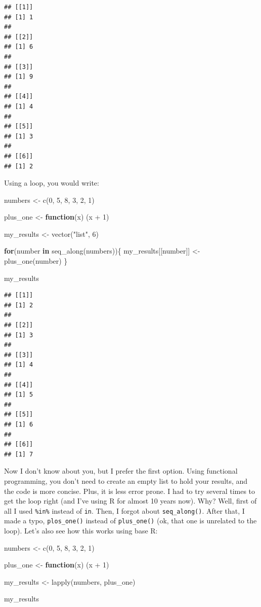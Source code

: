 \documentclass[
]{article}
\newenvironment{Shaded}{\begin{snugshade}}{\end{snugshade}}
\newcommand{\ControlFlowTok}[1]{\textcolor[rgb]{0.13,0.29,0.53}{\textbf{#1}}}
\newcommand{\DecValTok}[1]{\textcolor[rgb]{0.00,0.00,0.81}{#1}}
\newcommand{\FunctionTok}[1]{\textcolor[rgb]{0.00,0.00,0.00}{#1}}
\newcommand{\NormalTok}[1]{#1}
\newcommand{\OtherTok}[1]{\textcolor[rgb]{0.56,0.35,0.01}{#1}}
\newcommand{\SpecialCharTok}[1]{\textcolor[rgb]{0.00,0.00,0.00}{#1}}
\newcommand{\StringTok}[1]{\textcolor[rgb]{0.31,0.60,0.02}{#1}}
\begin{document}
\begin{verbatim}
## [[1]]
## [1] 1
## 
## [[2]]
## [1] 6
## 
## [[3]]
## [1] 9
## 
## [[4]]
## [1] 4
## 
## [[5]]
## [1] 3
## 
## [[6]]
## [1] 2
\end{verbatim}

Using a loop, you would write:

\begin{Shaded}
\begin{Highlighting}[]
\NormalTok{numbers }\OtherTok{\textless{}{-}} \FunctionTok{c}\NormalTok{(}\DecValTok{0}\NormalTok{, }\DecValTok{5}\NormalTok{, }\DecValTok{8}\NormalTok{, }\DecValTok{3}\NormalTok{, }\DecValTok{2}\NormalTok{, }\DecValTok{1}\NormalTok{)}

\NormalTok{plus\_one }\OtherTok{\textless{}{-}} \ControlFlowTok{function}\NormalTok{(x) (x }\SpecialCharTok{+} \DecValTok{1}\NormalTok{)}

\NormalTok{my\_results }\OtherTok{\textless{}{-}} \FunctionTok{vector}\NormalTok{(}\StringTok{"list"}\NormalTok{, }\DecValTok{6}\NormalTok{)}

\ControlFlowTok{for}\NormalTok{(number }\ControlFlowTok{in} \FunctionTok{seq\_along}\NormalTok{(numbers))\{}
\NormalTok{  my\_results[[number]] }\OtherTok{\textless{}{-}} \FunctionTok{plus\_one}\NormalTok{(number)}
\NormalTok{\}}

\NormalTok{my\_results}
\end{Highlighting}
\end{Shaded}

\begin{verbatim}
## [[1]]
## [1] 2
## 
## [[2]]
## [1] 3
## 
## [[3]]
## [1] 4
## 
## [[4]]
## [1] 5
## 
## [[5]]
## [1] 6
## 
## [[6]]
## [1] 7
\end{verbatim}

Now I don't know about you, but I prefer the first option. Using functional programming, you don't
need to create an empty list to hold your results, and the code is more concise. Plus,
it is less error prone. I had to try several times to get the loop right
(and I've using R for almost 10 years now). Why? Well, first of all I used \texttt{\%in\%} instead of \texttt{in}.
Then, I forgot about \texttt{seq\_along()}. After that, I made a typo, \texttt{plos\_one()} instead of \texttt{plus\_one()}
(ok, that one is unrelated to the loop). Let's also see how this works using base R:

\begin{Shaded}
\begin{Highlighting}[]
\NormalTok{numbers }\OtherTok{\textless{}{-}} \FunctionTok{c}\NormalTok{(}\DecValTok{0}\NormalTok{, }\DecValTok{5}\NormalTok{, }\DecValTok{8}\NormalTok{, }\DecValTok{3}\NormalTok{, }\DecValTok{2}\NormalTok{, }\DecValTok{1}\NormalTok{)}

\NormalTok{plus\_one }\OtherTok{\textless{}{-}} \ControlFlowTok{function}\NormalTok{(x) (x }\SpecialCharTok{+} \DecValTok{1}\NormalTok{)}

\NormalTok{my\_results }\OtherTok{\textless{}{-}} \FunctionTok{lapply}\NormalTok{(numbers, plus\_one)}

\NormalTok{my\_results}
\end{Highlighting}
\end{Shaded}
\end{document}
